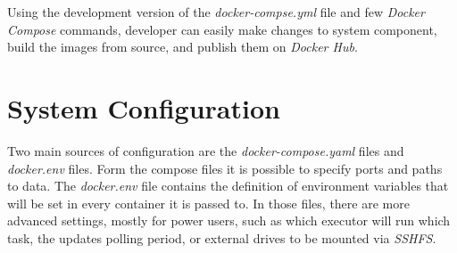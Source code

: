 Using the development version of the \textit{docker-compse.yml} file and few \textit{Docker Compose} commands, developer can easily make changes to system component, build the images from source, and publish them on \textit{Docker Hub}.
\section{System Configuration}
Two main sources of configuration are the \textit{docker-compose.yaml} files and \textit{docker.env} files. Form the compose files it is possible to specify ports and paths to data. The \textit{docker.env} file contains the definition of environment variables that will be set in every container it is passed to. In those files, there are more advanced settings, mostly for power users, such as which executor will run which task, the updates polling period, or external drives to be mounted via \textit{SSHFS}.
